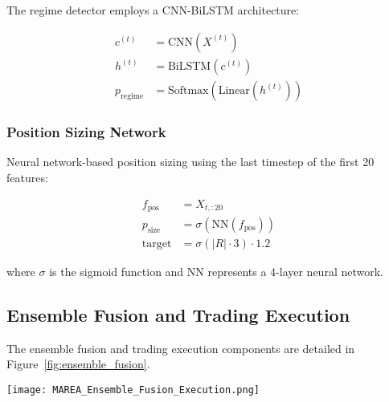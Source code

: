 \documentclass[10pt,twocolumn]{article}
\begin{document}
The regime detector employs a CNN-BiLSTM architecture:

\begin{align}
c^{(t)} &= \text{CNN}(X^{(t)}) \\
h^{(t)} &= \text{BiLSTM}(c^{(t)}) \\
p_{\text{regime}} &= \text{Softmax}(\text{Linear}(h^{(t)}))
\end{align}

\subsubsection{Position Sizing Network}

Neural network-based position sizing using the last timestep of the first 20 features:

\begin{align}
f_{\text{pos}} &= X_{t, :20} \\
p_{\text{size}} &= \sigma(\text{NN}(f_{\text{pos}})) \\
\text{target} &= \sigma(|R| \cdot 3) \cdot 1.2
\end{align}

where $\sigma$ is the sigmoid function and NN represents a 4-layer neural network.

\subsection{Ensemble Fusion and Trading Execution}

The ensemble fusion and trading execution components are detailed in Figure~\ref{fig:ensemble_fusion}.

\begin{figure*}[!htb]
\centering
\vspace{0.2cm}
\texttt{[image: MAREA\_Ensemble\_Fusion\_Execution.png]}
\vspace{0.1cm}
\caption{Ensemble Fusion and Trading Execution Engine. (1) The Ensemble Fusion Engine combines predictions from all five models using regime-aware weights. (2) Signal Processing Pipeline applies position scaling, return boost (1.25x), and ultra-aggressive multipliers with signal clipping. (3) Trading Execution Engine manages portfolio positions, calculates returns, and implements risk controls. (4) Risk Management monitors drawdowns, volatility, and performance metrics in real-time.}
\label{fig:ensemble_fusion}
\vspace{0.2cm}
\end{figure*}
\end{document}
